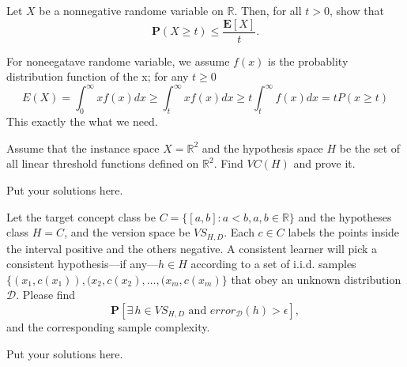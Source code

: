 \documentclass[11pt,letter,notitlepage]{article}
\begin{document}
\begin{exercise}
	Let $X$ be a nonnegative randome variable on $\mathbb{R}$. Then, for all $t>0$, show that
	$$\mathbf{P}(X\geq t)\leq \frac{\mathbf{E}[X]}{t}.$$
\end{exercise}

\begin{solution}
	   For noneegatave randome variable, we assume $f(x)$ is the probablity distribution function of the x;
	   for any  $t\geq 0$
		$$ E(X) = \int_{0}^{\infty} xf(x) dx \geq \int_{t}^{\infty} xf(x) dx  \geq t\int_{t}^{\infty} f(x) dx  = tP(x\geq t) $$ 
		\indent This exactly the what we need. 
\end{solution}


\begin{exercise}
	Assume that the instance space $X=\mathbb{R}^2$ and the hypothesis space $H$ be the set of all linear threshold functions defined on $\mathbb{R}^2$. Find $VC(H)$ and prove it.
\end{exercise}

\begin{solution}
	Put your solutions here. 
\end{solution}

\begin{exercise} 
	Let the target concept class be $C=\{[a,b]:a<b, a,b\in\mathbb{R}\}$ and the hypotheses class $H=C$, and the version space be $VS_{H,D}$. Each $c\in C$ labels the points inside the interval positive and the others negative. A consistent learner will pick a consistent hypothesis---if any---$h\in H$ according to a set of i.i.d. samples $\{(x_1,c(x_1)),(x_2,c(x_2),\ldots,(x_m,c(x_m)\}$ that obey an unknown distribution $\mathcal{D}$. Please find 
	$$\mathbf{P}[\exists\, h\in VS_{H,D} \mbox{ and } error_{\mathcal{D}}(h)>\epsilon],$$
	and the corresponding sample complexity.
\end{exercise}


\begin{solution}
	Put your solutions here. 
\end{solution}
\end{document}
